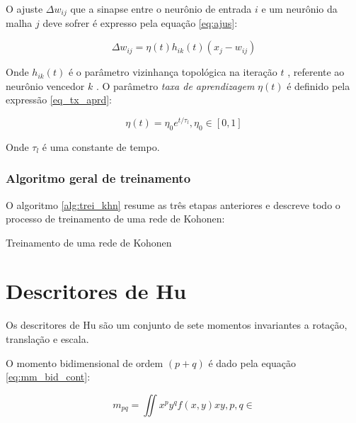 O ajuste $ \Delta w_{ij} $ que a sinapse entre o neurônio de entrada $ i $ e
um neurônio da malha $ j $ deve sofrer é expresso pela equação \ref{eq:ajus}:

\begin{equation}\label{eq:ajus}
\Delta w_{ij} = \eta(t) h_{ik}(t) (x_j - w_{ij})
\end{equation}

Onde $ h_{ik}(t) $ é o parâmetro vizinhança topológica na iteração $ t $ ,
referente ao neurônio vencedor $ k $ . O
parâmetro \textit{taxa de aprendizagem} $ \eta(t) $ é definido pela
expressão \ref{eq_tx_aprd}:

\begin{equation}\label{eq:tx_aprd}
\eta(t) = \eta_0 e^{ t / \tau_l }, \eta_0 \in [0, 1]
\end{equation}

Onde $ \tau_l $ é uma constante de tempo.

\subsubsection{Algoritmo geral de treinamento}

O algoritmo \ref{alg:trei_khn} resume as três etapas anteriores e descreve
todo o processo de treinamento de uma rede de Kohonen:

\begin{algorithm}[hbtp]
\caption{Treinamento de uma rede de Kohonen}\label{alg:trei_khn}
\end{algorithm}

\section{Descritores de Hu}

Os descritores de Hu são um conjunto de sete momentos invariantes a rotação,
translação e escala.

O momento bidimensional de ordem $ (p+q) $ é dado pela
equação \ref{eq:mm_bid_cont}:

\begin{equation}\label{eq:mm_bid_cont}
m_{pq} = \iint x^p y^q f(x, y) \limits{x} \limits{y}, p, q \in
\end{equation}

